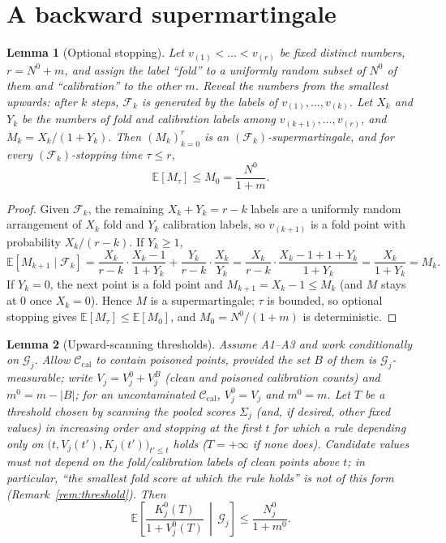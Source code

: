 \documentclass[11pt]{article}
\newtheorem{lemma}{Lemma}
\theoremstyle{definition}
\theoremstyle{remark}
\newcommand{\Cal}{\mathcal{C}_{\mathrm{cal}}}
\newcommand{\G}{\mathcal{G}}
\newcommand{\F}{\mathcal{F}}
\newcommand{\E}{\mathbb{E}}
\newcommand{\1}{\mathbf{1}}
\begin{document}
\section{A backward supermartingale}

\begin{lemma}[Optional stopping]\label{lem:martingale}
Let $v_{(1)}<\dots<v_{(r)}$ be fixed distinct numbers, $r=N^0+m$, and assign the label ``fold'' to
a uniformly random subset of $N^0$ of them and ``calibration'' to the other $m$. Reveal the
numbers from the smallest upwards: after $k$ steps, $\F_k$ is generated by the labels of
$v_{(1)},\dots,v_{(k)}$. Let $X_k$ and $Y_k$ be the numbers of fold and calibration labels among
$v_{(k+1)},\dots,v_{(r)}$, and $M_k=X_k/(1+Y_k)$. Then $(M_k)_{k=0}^{r}$ is an
$(\F_k)$-supermartingale, and for every $(\F_k)$-stopping time $\tau\le r$,
\[
\E[M_\tau]\le M_0=\frac{N^0}{1+m}.
\]
\end{lemma}

\begin{proof}
Given $\F_k$, the remaining $X_k+Y_k=r-k$ labels are a uniformly random arrangement of $X_k$
fold and $Y_k$ calibration labels, so $v_{(k+1)}$ is a fold point with probability
$X_k/(r-k)$. If $Y_k\ge1$,
\[
\E[M_{k+1}\mid\F_k]=\frac{X_k}{r-k}\cdot\frac{X_k-1}{1+Y_k}+\frac{Y_k}{r-k}\cdot\frac{X_k}{Y_k}
=\frac{X_k}{r-k}\cdot\frac{X_k-1+1+Y_k}{1+Y_k}=\frac{X_k}{1+Y_k}=M_k .
\]
If $Y_k=0$, the next point is a fold point and $M_{k+1}=X_k-1\le M_k$ (and $M$ stays at $0$ once
$X_k=0$). Hence $M$ is a supermartingale; $\tau$ is bounded, so optional stopping gives
$\E[M_\tau]\le\E[M_0]$, and $M_0=N^0/(1+m)$ is deterministic.
\end{proof}

\begin{lemma}[Upward-scanning thresholds]\label{lem:stopping}
Assume A1--A3 and work conditionally on $\G_j$. Allow $\Cal$ to contain poisoned points, provided
the set $B$ of them is $\G_j$-measurable; write $V_j=V^0_j+V^B_j$ (clean and poisoned calibration
counts) and $m^0=m-|B|$; for an uncontaminated $\Cal$, $V^0_j=V_j$ and $m^0=m$. Let $T$ be a
threshold chosen by scanning the
pooled scores $\Sigma_j$ (and, if desired, other fixed values) in increasing order and stopping at
the first $t$ for which a rule depending only on $\bigl(t, V_j(t'),K_j(t')\bigr)_{t'\le t}$ holds
($T=+\infty$ if none does). Candidate values must not depend on the fold/calibration labels of
clean points above $t$; in particular, ``the smallest \emph{fold} score at which the rule holds''
is \emph{not} of this form (Remark~\ref{rem:threshold}). Then
\[
\E\!\left[\frac{K^0_j(T)}{1+V^0_j(T)}\,\middle|\,\G_j\right]\le\frac{N_j^0}{1+m^0}.
\]
\end{lemma}
\end{document}
